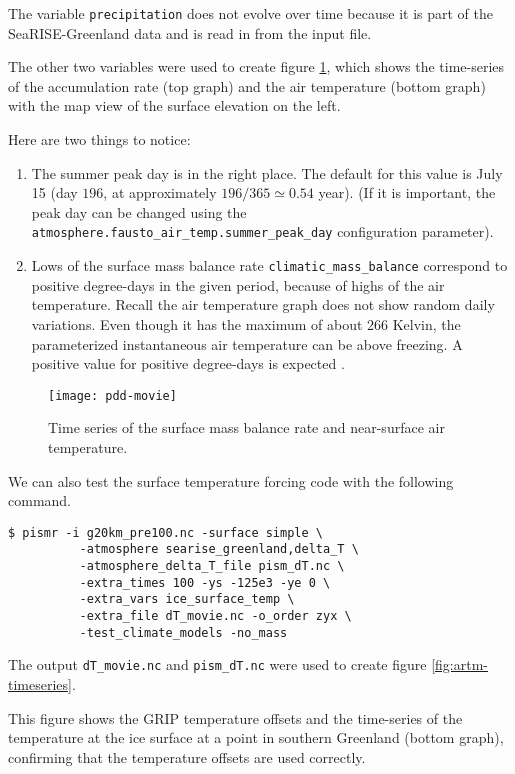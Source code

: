 \documentclass[titlepage,letterpaper,final]{scrartcl}
\begin{document}
The variable \texttt{precipitation} does not evolve over time because
it is part of the SeaRISE-Greenland data and is read in from the input file.

The other two variables were used to create figure \ref{fig:pddseries}, which
shows the time-series of the accumulation rate (top graph) and the air
temperature (bottom graph)  with the map view of the surface elevation on the left.

Here are two things to notice:
\begin{enumerate}
\item The summer peak day is in the right place.  The default for this value is
  July 15 (day $196$, at approximately $196/365 \simeq 0.54$ year).  (If it is
  important, the peak day can be changed using the \texttt{atmosphere.fausto_air_temp.summer_peak_day}
  configuration parameter).

\item Lows of the surface mass balance rate \texttt{climatic_mass_balance} correspond to
  positive degree-days in the given period, because of highs of the air
  temperature.  Recall the air temperature graph does
  not show random daily variations.  Even though it has the maximum of about $266$
  Kelvin, the parameterized instantaneous air temperature can be above freezing.
  A positive value for positive degree-days is expected \cite{CalovGreve05}.
\end{enumerate}

\begin{figure}[ht]
  \centering
  \texttt{[image: pdd-movie]}
  \caption{Time series of the surface mass balance rate and near-surface air temperature.}
  \label{fig:pddseries}
\end{figure}

\bigskip
We can also test the surface temperature forcing code with the following command.
\begin{verbatim}
$ pismr -i g20km_pre100.nc -surface simple \
          -atmosphere searise_greenland,delta_T \
          -atmosphere_delta_T_file pism_dT.nc \
          -extra_times 100 -ys -125e3 -ye 0 \
          -extra_vars ice_surface_temp \
          -extra_file dT_movie.nc -o_order zyx \
          -test_climate_models -no_mass
\end{verbatim}
The output \texttt{dT_movie.nc} and \texttt{pism_dT.nc} were used to create figure \ref{fig:artm-timeseries}.

This figure shows the GRIP temperature offsets and the time-series of the temperature at the ice surface at a point in southern Greenland (bottom graph), confirming that the temperature offsets are used correctly.
\end{document}
